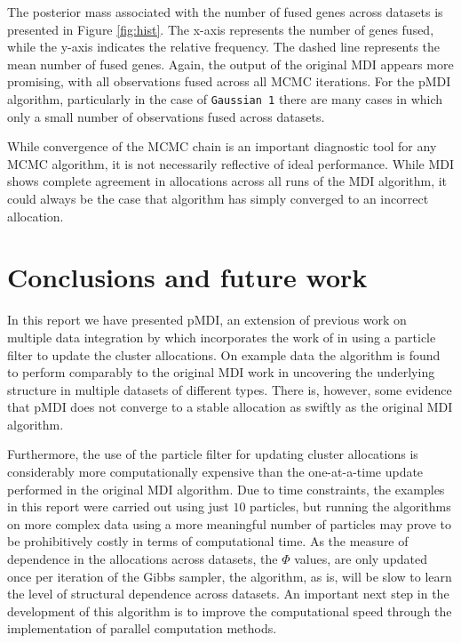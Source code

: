 \documentclass[10pt,a4paper]{article}
\begin{document}
The posterior mass associated with the number of fused genes across datasets is presented in Figure \ref{fig:hist}. The x-axis represents the number of genes fused, while the y-axis indicates the relative frequency. The dashed line represents the mean number of fused genes. Again, the output of the original MDI appears more promising, with all observations fused across all MCMC iterations. For the pMDI algorithm, particularly in the case of \texttt{Gaussian 1} there are many cases in which only a small number of observations fused across datasets.

While convergence of the MCMC chain is an important diagnostic tool for any MCMC algorithm, it is not necessarily reflective of ideal performance. While MDI shows complete agreement in allocations across all runs of the MDI algorithm, it could always be the case that algorithm has simply converged to an incorrect allocation.





\section{Conclusions and future work}
\label{sec:conclusions}
In this report we have presented pMDI, an extension of previous work on multiple data integration by  which incorporates the work of  in using a particle filter to update the cluster allocations. On example data the algorithm is found to perform comparably to the original MDI work in uncovering the underlying structure in multiple datasets of different types. There is, however, some evidence that pMDI does not converge to a stable allocation as swiftly as the original MDI algorithm.

Furthermore, the use of the particle filter for updating cluster allocations is considerably more computationally expensive than the one-at-a-time update performed in the original MDI algorithm. 
Due to time constraints, the examples in this report were carried out using just $10$ particles, but running the algorithms on more complex data using a more meaningful number of particles may prove to be prohibitively costly in terms of computational time. As the measure of dependence in the allocations across datasets, the $\Phi$ values, are only updated once per iteration of the Gibbs sampler, the algorithm, as is, will be slow to learn the level of structural dependence across datasets. An important next step in the development of this algorithm is to improve the computational speed through the implementation of parallel computation methods.
\end{document}
